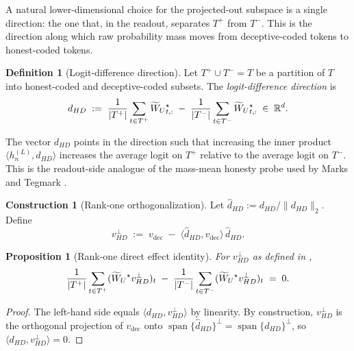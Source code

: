 \documentclass[11pt,letterpaper]{article}
\theoremstyle{plain}
\newtheorem{proposition}[theorem]{Proposition}
\theoremstyle{definition}
\newtheorem{definition}[theorem]{Definition}
\newtheorem{construction}[theorem]{Construction}
\DeclareMathOperator{\spann}{span}
\newcommand{\R}{\mathbb{R}}
\newcommand{\1}{\mathbf{1}}
\newcommand{\WUt}{\widetilde{W}_{U}\mathchoice{}{}{}{}}
\newcommand{\vdec}{v_{\text{dec}}}
\newcommand{\vperp}{v^{\perp}}
\newcommand{\hres}{h}
\begin{document}
A natural lower-dimensional choice for the projected-out subspace is a single direction: the one that, in the readout, separates $T^+$ from $T^-$. This is the direction along which raw probability mass moves from deceptive-coded tokens to honest-coded tokens.

\begin{definition}[Logit-difference direction]\label{def:hd}
Let $T^+ \cup T^- = T$ be a partition of $T$ into honest-coded and deceptive-coded subsets. The \emph{logit-difference direction} is
\begin{equation}
d_{HD} \;:=\; \frac{1}{|T^+|}\sum_{t \in T^+} \WUt^\star_{t,:} \;-\; \frac{1}{|T^-|}\sum_{t \in T^-} \WUt^\star_{t,:} \;\in\; \R^d.
\label{eq:dhd}
\end{equation}
\end{definition}

The vector $d_{HD}$ points in the direction such that increasing the inner product $\langle \hres^{(L)}_n, d_{HD}\rangle$ increases the average logit on $T^+$ relative to the average logit on $T^-$. This is the readout-side analogue of the mass-mean honesty probe used by Marks and Tegmark \cite{marks2024geometry}.

\begin{construction}[Rank-one orthogonalization]\label{constr:rankone}
Let $\hat{d}_{HD} := d_{HD} / \|d_{HD}\|_2$. Define
\begin{equation}
\vperp_{HD} \;:=\; \vdec \;-\; \langle \hat{d}_{HD}, \vdec\rangle \,\hat{d}_{HD}.
\label{eq:rankone}
\end{equation}
\end{construction}

\begin{proposition}[Rank-one direct effect identity]\label{prop:rankone}
For $\vperp_{HD}$ as defined in ,
\begin{equation}
\frac{1}{|T^+|}\sum_{t \in T^+} (\WUt^\star \vperp_{HD})_t \;-\; \frac{1}{|T^-|}\sum_{t \in T^-} (\WUt^\star \vperp_{HD})_t \;=\; 0.
\label{eq:rankoneidentity}
\end{equation}
\end{proposition}

\begin{proof}
The left-hand side equals $\langle d_{HD}, \vperp_{HD}\rangle$ by linearity. By construction, $\vperp_{HD}$ is the orthogonal projection of $\vdec$ onto $\spann\{\hat{d}_{HD}\}^\perp = \spann\{d_{HD}\}^\perp$, so $\langle d_{HD}, \vperp_{HD}\rangle = 0$.
\end{proof}
\end{document}
